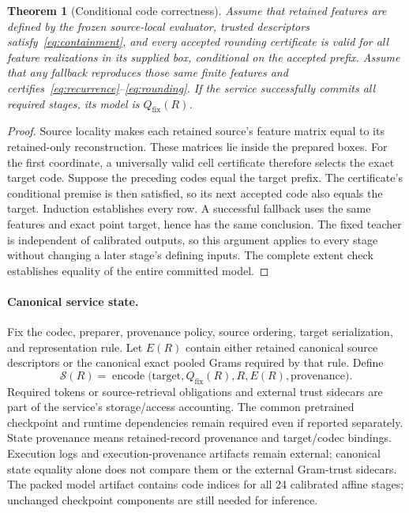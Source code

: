 \documentclass[10pt,twocolumn,letterpaper]{article}
\newtheorem{theorem}{Theorem}
\newcommand{\calS}{\mathcal{S}}
\newcommand{\Qfix}{Q_{\mathrm{fix}}}
\begin{document}
\begin{theorem}[Conditional code correctness]
\label{thm:codes}
Assume that retained features are defined by the frozen source-local evaluator,
trusted descriptors satisfy~\eqref{eq:containment}, and every accepted rounding
certificate is valid for all feature realizations in its supplied box, conditional
on the accepted prefix. Assume that any fallback reproduces those same finite
features and certifies~\eqref{eq:recurrence}--\eqref{eq:rounding}. If the service
successfully commits all required stages, its model is $\Qfix(R)$.
\end{theorem}
\begin{proof}
Source locality makes each retained source's feature matrix equal to its
retained-only reconstruction. These matrices lie inside the prepared boxes.
For the first coordinate, a universally valid cell certificate therefore selects
the exact target code. Suppose the preceding codes equal the target prefix. The
certificate's conditional premise is then satisfied, so its next accepted code
also equals the target. Induction establishes every row. A successful fallback
uses the same features and exact point target, hence has the same conclusion.
The fixed teacher is independent of calibrated outputs, so this argument applies
to every stage without changing a later stage's defining inputs. The complete
extent check establishes equality of the entire committed model.
\end{proof}

\paragraph{Canonical service state.}
Fix the codec, preparer, provenance policy, source ordering, target serialization,
and representation rule. Let $E(R)$ contain either retained canonical source
descriptors or the canonical exact pooled Grams required by that rule. Define
\begin{equation}
 \calS(R)=\operatorname{encode}\bigl(
   \text{target},\Qfix(R),R,E(R),\text{provenance}\bigr).
 \label{eq:state}
\end{equation}
Required tokens or source-retrieval obligations and external trust sidecars are
part of the service's storage/access accounting. The common pretrained checkpoint
and runtime dependencies remain required even if reported separately.
State provenance means retained-record provenance and target/codec bindings.
Execution logs and execution-provenance artifacts remain external; canonical
state equality alone does not compare them or the external Gram-trust sidecars.
The packed model artifact contains code indices for all 24 calibrated affine
stages; unchanged checkpoint components are still needed for inference.
\end{document}
